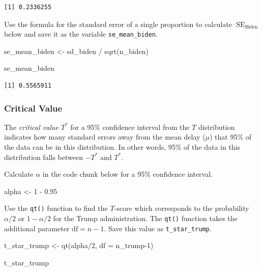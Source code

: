 \documentclass[
  letterpaper,
  DIV=11,
  numbers=noendperiod]{scrartcl}
\newenvironment{Shaded}{\begin{snugshade}}{\end{snugshade}}
\newcommand{\AttributeTok}[1]{\textcolor[rgb]{0.40,0.45,0.13}{#1}}
\newcommand{\DecValTok}[1]{\textcolor[rgb]{0.68,0.00,0.00}{#1}}
\newcommand{\FloatTok}[1]{\textcolor[rgb]{0.68,0.00,0.00}{#1}}
\newcommand{\FunctionTok}[1]{\textcolor[rgb]{0.28,0.35,0.67}{#1}}
\newcommand{\NormalTok}[1]{\textcolor[rgb]{0.00,0.23,0.31}{#1}}
\newcommand{\OtherTok}[1]{\textcolor[rgb]{0.00,0.23,0.31}{#1}}
\newcommand{\SpecialCharTok}[1]{\textcolor[rgb]{0.37,0.37,0.37}{#1}}
\begin{document}
\begin{verbatim}
[1] 0.2336255
\end{verbatim}

Use the formula for the standard error of a single proportion to
calculate \(\operatorname{SE}_{\text{Biden}}\) below and save it as the
variable \texttt{se\_mean\_biden}.

\begin{Shaded}
\begin{Highlighting}[]
\NormalTok{se\_mean\_biden }\OtherTok{\textless{}{-}}\NormalTok{ sd\_biden }\SpecialCharTok{/} \FunctionTok{sqrt}\NormalTok{(n\_biden)}

\NormalTok{se\_mean\_biden}
\end{Highlighting}
\end{Shaded}

\begin{verbatim}
[1] 0.5565911
\end{verbatim}

\subsubsection{Critical Value}\label{critical-value-1}

The \emph{critical value} \(T^*\) for a 95\% confidence interval from
the \(T\) distribution indicates how many standard errors away from the
mean delay (\(\mu\)) that 95\% of the data can be in this distribution.
In other words, 95\% of the data in this distribution falls between
\(-T^*\) and \(T^*\).

Calculate \(\alpha\) in the code chunk below for a 95\% confidence
interval.

\begin{Shaded}
\begin{Highlighting}[]
\NormalTok{alpha }\OtherTok{\textless{}{-}} \DecValTok{1} \SpecialCharTok{{-}} \FloatTok{0.95}
\end{Highlighting}
\end{Shaded}

Use the \texttt{qt()} function to find the \(T\)-score which corresponds
to the probability \(\alpha/2\) or \(1-\alpha/2\) for the Trump
administration. The \texttt{qt()} function takes the additional
parameter \(\text{df}=n-1\). Save this value as \texttt{t\_star\_trump}.

\begin{Shaded}
\begin{Highlighting}[]
\NormalTok{t\_star\_trump }\OtherTok{\textless{}{-}} \FunctionTok{qt}\NormalTok{(alpha}\SpecialCharTok{/}\DecValTok{2}\NormalTok{, }
                   \AttributeTok{df =}\NormalTok{ n\_trump}\DecValTok{{-}1}\NormalTok{)}

\NormalTok{t\_star\_trump}
\end{Highlighting}
\end{Shaded}
\end{document}
